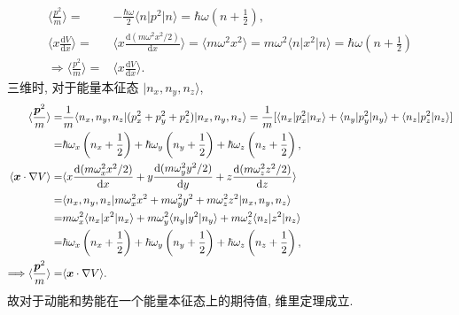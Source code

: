 \documentclass{assignment}
\begin{document}
\begin{sol}
\begin{itemize}
\begin{align}
            \langle\frac{p^2}{m}\rangle=&-\frac{\hbar\omega}{2}\langle n\rvert p^2\lvert n\rangle=\hbar\omega\left(n+\frac{1}{2}\right),\\
            \langle x\frac{\mathrm{d}V}{\mathrm{d}x}\rangle=&\langle x\frac{\mathrm{d}(m\omega^2x^2/2)}{\mathrm{d}x}\rangle=\langle m\omega^2x^2\rangle=m\omega^2\langle n\rvert x^2\lvert n\rangle=\hbar\omega\left(n+\frac{1}{2}\right)\\
            \Longrightarrow\langle\frac{p^2}{m}\rangle=&\langle x\frac{\mathrm{d}V}{\mathrm{d}x}\rangle.
        \end{align}
        三维时, 对于能量本征态 $\lvert n_x,n_y,n_z\rangle$,
        \begin{align}
            \notag\langle\frac{\bm{p}^2}{m}\rangle=&\frac{1}{m}\langle n_x,n_y,n_z\rvert(p_x^2+p_y^2+p_z^2)\lvert n_x,n_y,n_z\rangle=\frac{1}{m}[\langle n_x\rvert p_x^2\lvert n_x\rangle+\langle n_y\rvert p_y^2\lvert n_y\rangle+\langle n_z\rvert p_z^2\lvert n_z\rangle]\\
            =&\hbar\omega_x\left(n_x+\frac{1}{2}\right)+\hbar\omega_y\left(n_y+\frac{1}{2}\right)+\hbar\omega_z\left(n_z+\frac{1}{2}\right),\\
            \notag\langle\bm{x}\cdot\nabla V\rangle=&\langle x\frac{\mathrm{d}(m\omega_x^2x^2/2)}{\mathrm{d}x}+y\frac{\mathrm{d}(m\omega_y^2y^2/2)}{\mathrm{d}y}+z\frac{\mathrm{d}(m\omega_z^2z^2/2)}{\mathrm{d}z}\rangle\\
            \notag=&\langle n_x,n_y,n_z\rvert m\omega_x^2x^2+m\omega_y^2y^2+m\omega_z^2z^2\lvert n_x,n_y,n_z\rangle\\
            \notag=&m\omega_x^2\langle n_x\rvert x^2\lvert n_x\rangle+m\omega_y^2\langle n_y\rvert y^2\lvert n_y\rangle+m\omega_z^2\langle n_z\rvert z^2\lvert n_z\rangle\\
            =&\hbar\omega_x\left(n_x+\frac{1}{2}\right)+\hbar\omega_y\left(n_y+\frac{1}{2}\right)+\hbar\omega_z\left(n_z+\frac{1}{2}\right),\\
            \Longrightarrow\langle\frac{\bm{p}^2}{m}\rangle=&\langle\bm{x}\cdot\nabla V\rangle.
        \end{align}
        故对于动能和势能在一个能量本征态上的期待值, 维里定理成立.
    \end{itemize}
\end{sol}
\end{document}
